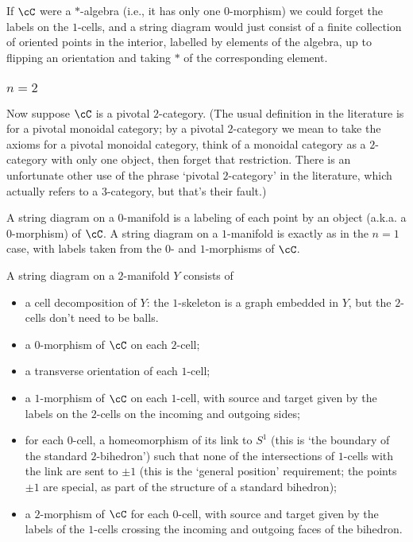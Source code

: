 \documentclass[11pt]{amsart}
\theoremstyle{plain}
\begin{document}
If $\cC$ were a $*$-algebra (i.e., it has only one $0$-morphism) we could forget the labels on the $1$-cells, and a string diagram would just consist of a finite collection of oriented points in the interior, labelled by elements of the algebra, up to flipping an orientation and taking $*$ of the corresponding element.

\subsubsection{$n=2$}
Now suppose $\cC$ is a pivotal $2$-category. (The usual definition in the literature is for a pivotal monoidal category; by a pivotal $2$-category we mean to take the axioms for a pivotal monoidal category, think of a monoidal category as a $2$-category with only one object, then forget that restriction. There is an unfortunate other use of the phrase `pivotal $2$-category' in the literature, which actually refers to a $3$-category, but that's their fault.)

A string diagram on a $0$-manifold is a labeling of each point by an object (a.k.a. a $0$-morphism) of $\cC$. A string diagram on a $1$-manifold is exactly as in the $n=1$ case, with labels taken from the $0$- and $1$-morphisms of $\cC$.

A string diagram on a $2$-manifold $Y$ consists of
\begin{itemize}
\item a cell decomposition of $Y$: the $1$-skeleton is a graph embedded in $Y$, but the $2$-cells don't need to be balls.
\item a $0$-morphism of $\cC$ on each $2$-cell;
\item a transverse orientation of each $1$-cell;
\item a $1$-morphism of $\cC$ on each $1$-cell, with source and target given by the labels on the $2$-cells on the incoming and outgoing sides;
\item for each $0$-cell, a homeomorphism of its link to $S^1$ (this is `the boundary of the standard $2$-bihedron') such that none of the intersections of $1$-cells with the link are sent to $\pm 1$ (this is the `general position' requirement; the points $\pm 1$ are special, as part of the structure of a standard bihedron);
\item a $2$-morphism of $\cC$ for each $0$-cell, with source and target given by the labels of the $1$-cells crossing the incoming and outgoing faces of the bihedron.
\end{itemize}
\end{document}
